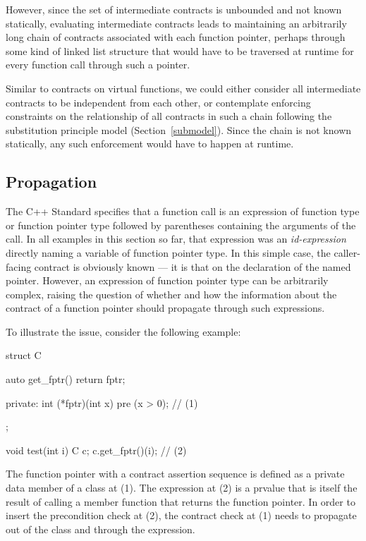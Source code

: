 However, since the set of intermediate contracts is unbounded and not known statically, evaluating intermediate contracts leads to maintaining an arbitrarily long chain of contracts associated with each function pointer, perhaps through some kind of linked list structure that would have to be traversed at runtime for every function call through such a pointer. 

Similar to contracts on virtual functions, we could either consider all intermediate contracts to be independent from each other, or contemplate enforcing constraints on the relationship of all contracts in such a chain following the substitution principle model (Section~\ref{submodel}). Since the chain is not known statically, any such enforcement would have to happen at runtime.

\subsection{Propagation}
\label{expr}

The C++ Standard specifies that a function call is an expression of function type or function pointer type followed by parentheses containing the arguments of the call. In all examples in this section so far, that expression was an \emph{id-expression} directly naming a variable of function pointer type. In this simple case, the caller-facing contract is obviously known --- it is that on the declaration of the named pointer. However, an expression of function pointer type can be arbitrarily complex, raising the question of whether and how the information about the contract of a function pointer should propagate through such expressions.

To illustrate the issue, consider the following example:
\begin{codeblock}
struct C {
  auto get_fptr() { return fptr; }
  
private:
  int (*fptr)(int x) pre (x > 0);  // (1)
};

void test(int i) {
  C c;
  c.get_fptr()(i);  // (2)
}
\end{codeblock}
The function pointer with a contract assertion sequence is defined as a private data member of a class at (1). The expression at (2) is a prvalue that is itself the result of calling a member function that returns the function pointer. In order to insert the precondition check at (2), the contract check at (1) needs to propagate out of the class and through the expression.

